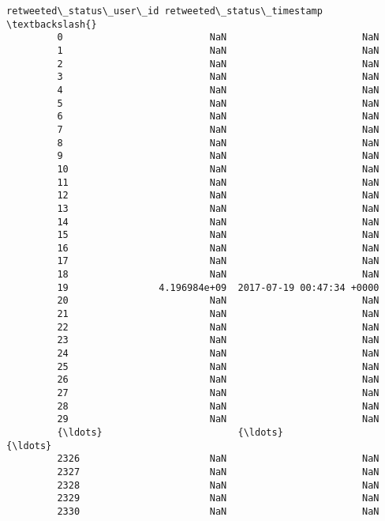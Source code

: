 \documentclass[11pt]{article}
\begin{document}
\begin{Verbatim}[commandchars=\\\{\}]
               retweeted\_status\_user\_id retweeted\_status\_timestamp  \textbackslash{}
         0                          NaN                        NaN   
         1                          NaN                        NaN   
         2                          NaN                        NaN   
         3                          NaN                        NaN   
         4                          NaN                        NaN   
         5                          NaN                        NaN   
         6                          NaN                        NaN   
         7                          NaN                        NaN   
         8                          NaN                        NaN   
         9                          NaN                        NaN   
         10                         NaN                        NaN   
         11                         NaN                        NaN   
         12                         NaN                        NaN   
         13                         NaN                        NaN   
         14                         NaN                        NaN   
         15                         NaN                        NaN   
         16                         NaN                        NaN   
         17                         NaN                        NaN   
         18                         NaN                        NaN   
         19                4.196984e+09  2017-07-19 00:47:34 +0000   
         20                         NaN                        NaN   
         21                         NaN                        NaN   
         22                         NaN                        NaN   
         23                         NaN                        NaN   
         24                         NaN                        NaN   
         25                         NaN                        NaN   
         26                         NaN                        NaN   
         27                         NaN                        NaN   
         28                         NaN                        NaN   
         29                         NaN                        NaN   
         {\ldots}                        {\ldots}                        {\ldots}   
         2326                       NaN                        NaN   
         2327                       NaN                        NaN   
         2328                       NaN                        NaN   
         2329                       NaN                        NaN   
         2330                       NaN                        NaN   

\end{Verbatim}
\end{document}
